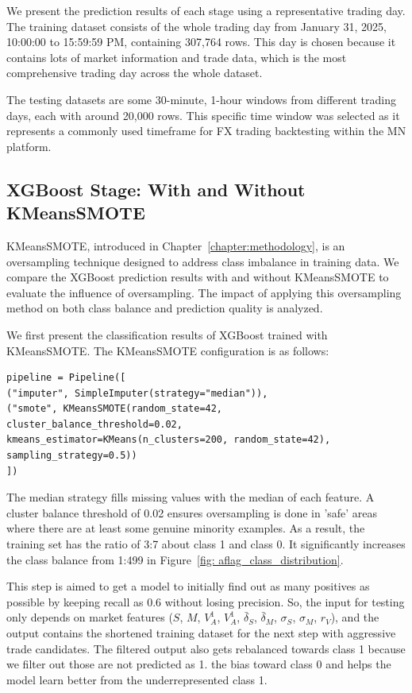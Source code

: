 We present the prediction results of each stage using a representative trading day. The training dataset consists of the whole trading day from January 31, 2025, 10:00:00 to 15:59:59 PM, containing 307,764 rows. This day is chosen because it contains lots of market information and trade data, which is the most comprehensive trading day across the whole dataset. 

The testing datasets are some 30-minute, 1-hour windows from different trading days, each with around 20,000 rows. This specific time window was selected as it represents a commonly used timeframe for FX trading backtesting within the MN platform.

\subsection{XGBoost Stage: With and Without KMeansSMOTE}

KMeansSMOTE, introduced in Chapter~\ref{chapter:methodology}, is an oversampling technique designed to address class imbalance in training data. We compare the XGBoost prediction results with and without KMeansSMOTE to evaluate the influence of oversampling. The impact of applying this oversampling method on both class balance and prediction quality is analyzed.

We first present the classification results of XGBoost trained with KMeansSMOTE. The KMeansSMOTE configuration is as follows:

\begin{verbatim}
pipeline = Pipeline([
("imputer", SimpleImputer(strategy="median")),
("smote", KMeansSMOTE(random_state=42,
cluster_balance_threshold=0.02,
kmeans_estimator=KMeans(n_clusters=200, random_state=42),
sampling_strategy=0.5))
])
\end{verbatim}

The median strategy fills missing values with the median of each feature. A cluster balance threshold of 0.02 ensures oversampling is done in 'safe' areas where there are at least some genuine minority examples. As a result, the training set has the ratio of 3:7 about class 1 and class 0. It significantly increases the class balance from 1:499 in Figure~\ref{fig: aflag_class_distribution}.

This step is aimed to get a model to initially find out as many positives as possible by keeping recall as 0.6 without losing precision. So, the input for testing only depends on market features ($S$, $M$, $V_A^{1}$, $V_A^{1}$, $\bar{\delta}_S$, $\bar{\delta}_M$, $\sigma_S$, $\sigma_M$, $r_V$), and the output contains the shortened training dataset for the next step with aggressive trade candidates. The filtered output also gets rebalanced towards class 1 because we filter out those are not predicted as 1. the bias toward class 0 and helps the model learn better from the underrepresented class 1.

